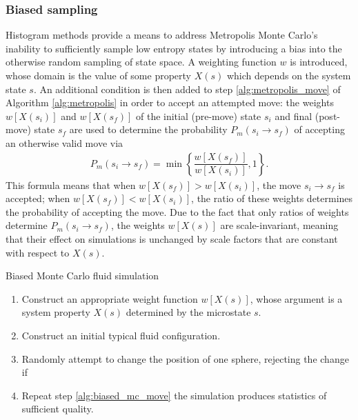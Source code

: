 \documentclass[11pt]{article}
\newcommand{\f}[2]{\dfrac{#1}{#2}} %
\newcommand{\p}[1]{\left(#1\right)} %
\renewcommand{\sp}[1]{\left[#1\right]} %
\renewcommand{\set}[1]{\left\{#1\right\}} %
\newenvironment{alg}
{\hrulefill\begin{enumerate}}
{\end{enumerate}\hrulefill}
\begin{document}
\subsubsection{Biased sampling}
\label{sec:biased_sampling}

Histogram methods provide a means to address Metropolis Monte Carlo's
inability to sufficiently sample low entropy states by introducing a
bias into the otherwise random sampling of state space. A weighting
function $w$ is introduced, whose domain is the value of some property
$X\p{s}$ which depends on the system state $s$. An additional
condition is then added to step \ref{alg:metropolis_move} of Algorithm
\ref{alg:metropolis} in order to accept an attempted move: the weights
$w\sp{X\p{s_i}}$ and $w\sp{X\p{s_f}}$ of the initial (pre-move) state
$s_i$ and final (post-move) state $s_f$ are used to determine the
probability $P_m\p{s_i\to s_f}$ of accepting an otherwise valid move
via
\begin{align}
  P_m\p{s_i\to s_f}=\min\set{\f{w\sp{X\p{s_f}}}{w\sp{X\p{s_i}}},1}.
  \label{eq:move_prob}
\end{align}
This formula means that when $w\sp{X\p{s_f}}>w\sp{X\p{s_i}}$, the move
$s_i\to s_f$ is accepted; when $w\sp{X\p{s_f}}<w\sp{X\p{s_i}}$, the
ratio of these weights determines the probability of accepting the
move. Due to the fact that only ratios of weights determine
$P_m\p{s_i\to s_f}$, the weights $w\sp{X\p{s}}$ are scale-invariant,
meaning that their effect on simulations is unchanged by scale factors
that are constant with respect to $X\p{s}$.

\begin{algorithm}[tb]
  \caption{Biased Monte Carlo fluid simulation}
  \label{alg:biased_MC}
  \begin{alg}

  \item Construct an appropriate weight function $w\sp{X\p{s}}$, whose
    argument is a system property $X\p{s}$ determined by the
    microstate $s$.

  \item Construct an initial typical fluid configuration.

  \item Randomly attempt to change the position of one sphere,
    rejecting the change if
    \label{alg:biased_mc_move}

  \item Repeat step \ref{alg:biased_mc_move} the simulation produces
    statistics of sufficient quality.

  \end{alg}
\end{algorithm}
\end{document}

